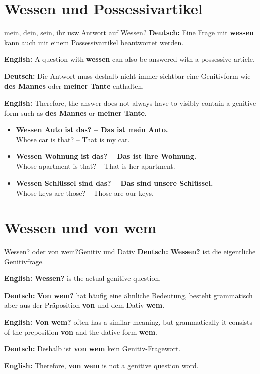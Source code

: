 \documentclass[a4paper,11pt]{article}
\newcommand{\GermanText}[1]{\textbf{Deutsch: }#1\par}
\newcommand{\EnglishText}[1]{{\small\color{SoftGray}\textbf{English: }#1\par}}
\newcommand{\ExampleItem}[2]{\item \textbf{#1}\\{\small\color{SoftGray}#2}}
\begin{document}
    
    \section{Wessen und Possessivartikel}
        
        \begin{grammarentry}{mein, dein, sein, ihr usw.}{Antwort auf Wessen?}
            \GermanText{Eine Frage mit \textbf{wessen} kann auch mit einem Possessivartikel beantwortet werden.}
            \EnglishText{A question with \textbf{wessen} can also be answered with a possessive article.}
            
            \GermanText{Die Antwort muss deshalb nicht immer sichtbar eine Genitivform wie \textbf{des Mannes} oder \textbf{meiner Tante} enthalten.}
            \EnglishText{Therefore, the answer does not always have to visibly contain a genitive form such as \textbf{des Mannes} or \textbf{meiner Tante}.}
        \end{grammarentry}
        
        \begin{exbox}
            \begin{itemize}
                \ExampleItem{Wessen Auto ist das? -- Das ist mein Auto.}{Whose car is that? -- That is my car.}
                \ExampleItem{Wessen Wohnung ist das? -- Das ist ihre Wohnung.}{Whose apartment is that? -- That is her apartment.}
                \ExampleItem{Wessen Schlüssel sind das? -- Das sind unsere Schlüssel.}{Whose keys are those? -- Those are our keys.}
            \end{itemize}
        \end{exbox}
    
    
    \section{Wessen und \glqq von wem\grqq}
        
        \begin{grammarentry}{Wessen? oder von wem?}{Genitiv und Dativ}
            \GermanText{\textbf{Wessen?} ist die eigentliche Genitivfrage.}
            \EnglishText{\textbf{Wessen?} is the actual genitive question.}
            
            \GermanText{\textbf{Von wem?} hat häufig eine ähnliche Bedeutung, besteht grammatisch aber aus der Präposition \textbf{von} und dem Dativ \textbf{wem}.}
            \EnglishText{\textbf{Von wem?} often has a similar meaning, but grammatically it consists of the preposition \textbf{von} and the dative form \textbf{wem}.}
            
            \GermanText{Deshalb ist \textbf{von wem} kein Genitiv-Fragewort.}
            \EnglishText{Therefore, \textbf{von wem} is not a genitive question word.}
        \end{grammarentry}
        
\end{document}
